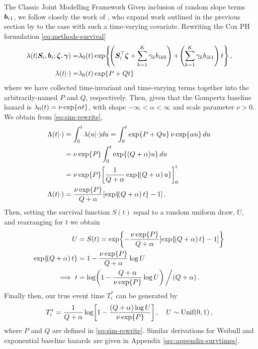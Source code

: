 \begin{chapter}{\label{cha:methods-classic}The Classic Joint Modelling Framework}
  Given inclusion of random slope terms $\bm{b}_i{_1}$, we follow closely the work of \citet{Austin2012}, who expand work outlined in the previous section by \citet{Bender2005} to the case with such a time-varying covariate. Rewriting the Cox PH formulation \eqref{eq:methods-survival}
  \begin{equation}
  \begin{aligned}
      \lambda(t|\bm{S}_i,\bm{b}_i;\bm{\zeta},\bm{\gamma})=&\lambda_0(t)\exp\!\left\{\!\left(\bm{S}_i^\top\bm{\zeta}+\sum_{k=1}^K\gamma_kb_{ik0}\right) + 
      \!\left(\sum_{k=1}^K\gamma_kb_{ik1}\right) t\right\},\\
      \lambda(t|\cdot)=&\lambda_0(t)\exp\!\left\{ P + Qt\right\}
  \end{aligned}
  \label{eq:sim-rewrite}
  \end{equation}
  where we have collected time-invariant and time-varying terms together into the arbitrarily-named $P$ and $Q$, respectively. Then, given that the Gompertz baseline hazard is $\lambda_0(t)=\nu\exp\!\left\{\alpha t\right\}$, with shape $-\infty<\alpha<\infty$ and scale parameter $\nu>0$. We obtain from \eqref{eq:sim-rewrite},
  \begin{align*}
      \Lambda(t|\cdot)&=\intzt\lambda(u|\cdot)du=\intzt\exp\lbr P+Qu\rbr\nu\exp\lbr\alpha u\rbr du\\
      &=\nu\exp\lbr P\rbr\intzt\exp\lbr (Q + \alpha)u\rbr du\\
      &=\nu\exp\lbr P\rbr\ls\frac{1}{Q + \alpha}\exp\lbr\lb Q + \alpha\rb u\rbr\rs^t_0\\
      \Lambda(t|\cdot)&=\frac{\nu\exp\lbr P\rbr}{Q + \alpha}\ls\exp\lbr\lb Q+\alpha\rb t\rbr-1\rs.
  \end{align*}
  Then, setting the survival function $S(t)$ equal to a random uniform draw, $U$, and rearranging for $t$ we obtain
  \begin{align*}
      U&=S\lb t\rb=\exp\lbr-\frac{\nu\exp\lbr P\rbr}{Q + \alpha}\ls\exp\lbr\lb Q + \alpha\rb t\rbr-1\rs\rbr\\
      \exp\lbr\lb Q + \alpha\rb t\rbr&=1-\frac{\nu\exp\lbr P\rbr}{Q + \alpha}\log U\\
      \implies t&=\log\lb1-\frac{Q + \alpha}{\nu\exp\lbr P\rbr}\log U\rb\bigg /\lb Q + \alpha\rb.
  \end{align*}
  Finally then, our true event time $T_i^*$ can be generated by
  \begin{equation}
      T_i^*=\frac{1}{Q+\alpha}\log\!\left[1-\frac{(Q+\alpha)\log U}{\nu\exp\!\left\{ P\right\}}\right],\quad U\sim\text{Unif}\!\left(0,1\right),
  \label{eq:sim-jm}
  \end{equation}
  where $P$ and $Q$ are defined in \eqref{eq:sim-rewrite}. Similar derivations for Weibull and exponential baseline hazards are given in Appendix \ref{sec:appendix-survtimes}. 


\end{chapter}

